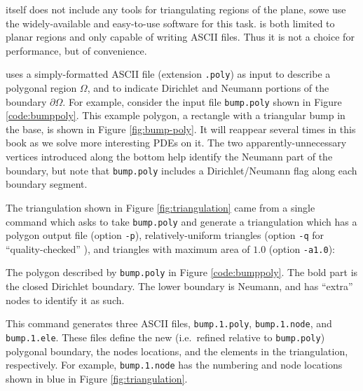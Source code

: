 \PETSc itself does not include any tools for triangulating regions of the plane, sowe use the widely-available and easy-to-use \Triangle{} software \citep{Shewchuk1996} for this task.  \Triangle is both limited to planar regions and only capable of writing ASCII files.  Thus it is not a choice for performance, but of convenience.

\Triangle uses a simply-formatted ASCII file (extension \texttt{.poly}) as input to describe a polygonal region $\Omega$, and to indicate Dirichlet and Neumann portions of the boundary $\partial \Omega$.  For example, consider the input file \texttt{bump.poly} shown in Figure \ref{code:bumppoly}.  This example polygon, a rectangle with a triangular bump in the base, is shown in Figure \ref{fig:bump-poly}.  It will reappear several times in this book as we solve more interesting PDEs on it.  The two apparently-unnecessary vertices introduced along the bottom help identify the Neumann part of the boundary, but note that \texttt{bump.poly} includes a Dirichlet/Neumann flag along each boundary segment.


The triangulation shown in Figure \ref{fig:triangulation} came from a single command which asks \Triangle to take \texttt{bump.poly} and generate a triangulation which has a polygon output file (option \texttt{-p}), relatively-uniform triangles (option \texttt{-q} for ``quality-checked'' \citep{Shewchuk1996}), and triangles with maximum area of $1.0$ (option \texttt{-a1.0}):
\begin{marginfigure}

\caption{The polygon described by \texttt{bump.poly} in Figure \ref{code:bumppoly}.  The bold part is the closed Dirichlet boundary.  The lower boundary is Neumann, and has ``extra'' nodes to identify it as such.}
\label{fig:bump-poly}
\end{marginfigure}
This command generates three ASCII files, \texttt{bump.1.poly}, \texttt{bump.1.node}, and  \texttt{bump.1.ele}.  These files define the new (i.e.~refined relative to \texttt{bump.poly}) polygonal boundary, the nodes locations, and the elements in the triangulation, respectively.  For example, \texttt{bump.1.node} has the numbering and node locations shown in blue in Figure \ref{fig:triangulation}.

